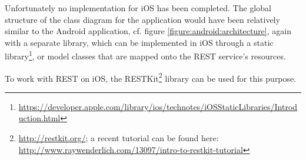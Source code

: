 Unfortunately no implementation for iOS has been completed. The global structure of the class diagram for the application would have been relatively similar to the Android application, cf. figure \ref{figure:android:architecture}, again with a separate library, which can be implemented in iOS through a static library\footnote{\url{https://developer.apple.com/library/ios/technotes/iOSStaticLibraries/Introduction.html}}, or model classes that are mapped onto the REST service's resources.

To work with REST on iOS, the RESTKit\footnote{\url{http://restkit.org/}; a recent tutorial can be found here: \url{http://www.raywenderlich.com/13097/intro-to-restkit-tutorial}} library can be used for this purpose.



